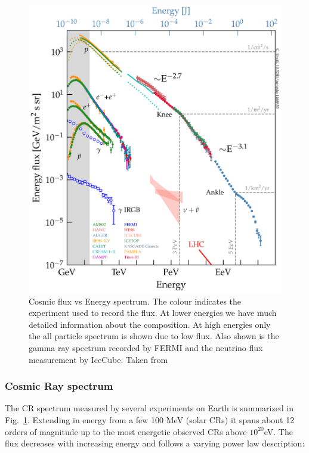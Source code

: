 \begin{figure}[t!]
  \centering
  \includegraphics[width=14.5cm]{thesis_figures/CRnNu/all_particle_spectrum.png}
  \caption{Cosmic flux vs Energy spectrum. The colour indicates the experiment used to record the flux. At lower energies we have much detailed information about the composition. At high energies only the all particle spectrum is shown due to low flux. Also shown is the gamma ray spectrum recorded by FERMI and the neutrino flux measurement by IceCube. Taken from ~\cite{evoli_2018_2360277}}
  \label{fig:CR-spectrum}
\end{figure}
\subsubsection*{Cosmic Ray spectrum}
\label{subsubsec:CRspectrum}
The \gls{CR} spectrum measured by several experiments on Earth is summarized in Fig.~\ref{fig:CR-spectrum}. Extending in energy from a few 100 MeV (solar \glspl{CR}) it spans about 12 orders of magnitude up to the most energetic observed \glspl{CR} above $10^{20}$eV. The flux decreases with increasing energy and follows a varying power law description:

